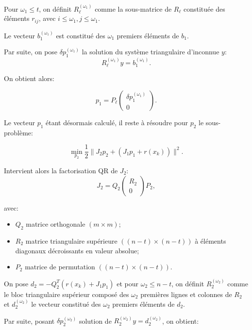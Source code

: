 Pour $\omega_{1} \leq t$, on définit $R_{\ell}^{(\omega_{1})}$ comme la sous-matrice de $R_{\ell}$ constituée des éléments $r_{ij}$, avec $i \leq \omega_{1},j \leq \omega_1$. 

Le vecteur $b_{1}^{(\omega_{1})}$  est constitué des $\omega_{1}$ premiers éléments de $b_{1}$.

 Par suite, on pose $\delta p_1^{(\omega_{1})}$ la solution du système triangulaire d'inconnue $y$:  
 $$R_{\ell}^{(\omega_{1})}y=b_{1}^{(\omega_{1})}.$$
 
 On obtient alors:

\begin{equation}\label{calcul p1}
p_1 = P_{\ell}\begin{pmatrix} \delta p_1^{(\omega_{1})} \\ 0 \end{pmatrix}.
\end{equation}

Le vecteur $p_1$ étant désormais calculé, il reste à résoudre pour $p_2$ le sous-problème:

$$\underset{p_2}{\min} \dfrac{1}{2}\|J_2p_2 + (J_1p_1 + r(x_{k}))\|^2.$$ 

Intervient alors la factorisation QR de $J_{2}$:
\begin{equation} \label{qrJ2}
J_{2} = Q_2\begin{pmatrix} R_{2} \\ 0\end{pmatrix}P_2,
\end{equation}

avec:
\begin{itemize}
\item
$Q_2$ matrice orthogonale $(m \times m)$;
\item
$R_{2}$ matrice triangulaire supérieure $((n-t) \times (n-t))$ à éléments diagonaux décroissants en valeur absolue; 
\item
$P_2$ matrice de permutation $((n-t) \times (n-t))$.
\end{itemize}

On pose $d_{2} = -Q_2^T(r(x_{k}) + J_1p_1)$ et pour $\omega_{2} \leq n-t$, on définit $R_{2}^{(\omega_{2} )}$ comme le bloc triangulaire supérieur 
composé des $\omega_{2}$ premières lignes et colonnes de $R_{2}$ et $d_{2}^{(\omega_{2})} $ le vecteur constitué des $\omega_{2}$ premiers éléments de $d_{2}$.

Par suite, posant $\delta p_2^{(\omega_{2})}$ solution de $R_{2}^{(\omega_{2})}y =d_2^{(\omega_{2})}$, on obtient:

